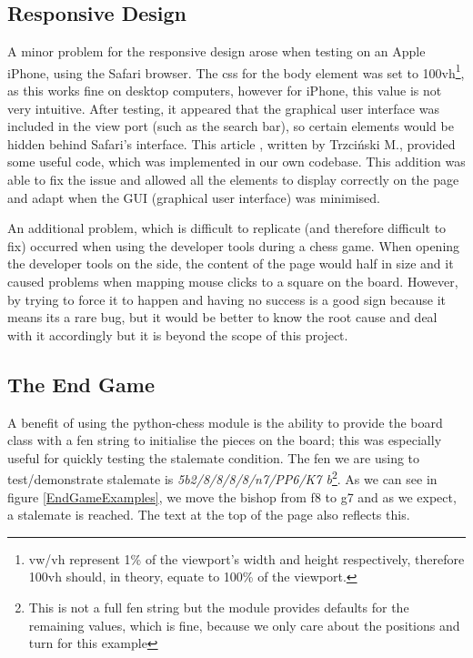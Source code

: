 \subsection{Responsive Design}

A minor problem for the responsive design arose when testing on an Apple iPhone, using the Safari browser. The css for the body element was set to 100vh\footnote{vw/vh represent 1\% of the viewport's width and height respectively, therefore 100vh should, in theory, equate to 100\% of the viewport.}, as this works fine on desktop computers, however for iPhone, this value is not very intuitive. After testing, it appeared that the graphical user interface was included in the view port (such as the search bar), so certain elements would be hidden behind Safari's interface. This article \cite{100vhFix}, written by Trzciński M., provided some useful code, which was implemented in our own codebase. This addition was able to fix the issue and allowed all the elements to display correctly on the page and adapt when the GUI (graphical user interface) was minimised.

An additional problem, which is difficult to replicate (and therefore difficult to fix) occurred when using the developer tools during a chess game. When opening the developer tools on the side, the content of the page would half in size and it caused problems when mapping mouse clicks to a square on the board. However, by trying to force it to happen and having no success is a good sign because it means its a rare bug, but it would be better to know the root cause and deal with it accordingly but it is beyond the scope of this project.

\subsection{The End Game}

A benefit of using the python-chess module is the ability to provide the board class with a fen string to initialise the pieces on the board; this was especially useful for quickly testing the stalemate condition. The fen we are using to test/demonstrate stalemate is \emph{5b2/8/8/8/8/n7/PP6/K7 b}\footnote{This is not a full fen string but the module provides defaults for the remaining values, which is fine, because we only care about the positions and turn for this example}. As we can see in figure \ref{EndGameExamples}, we move the bishop from f8 to g7 and as we expect, a stalemate is reached. The text at the top of the page also reflects this.

